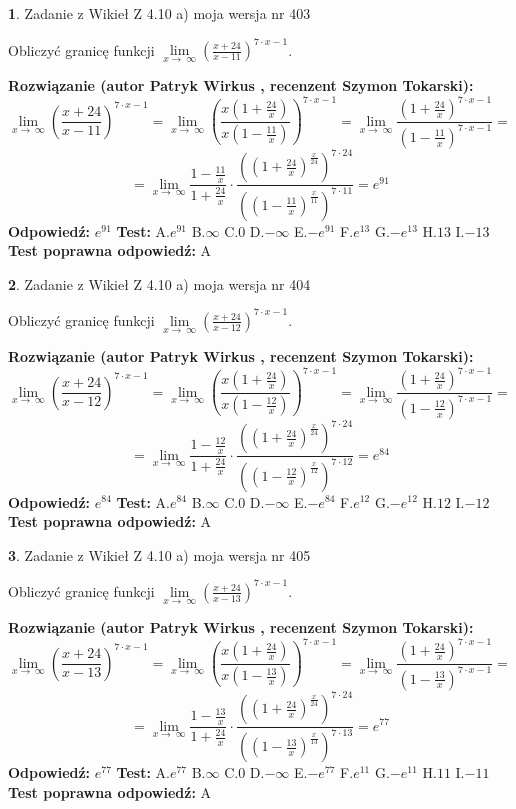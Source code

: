 \documentclass[12pt, a4paper]{article}
\theoremstyle{definition} %
\newtheorem{zad}{}
\newcommand{\zadStart}[1]{\begin{zad}#1\newline}
\newcommand{\zadStop}{\end{zad}}
\newcommand{\rozwStart}[2]{\noindent \textbf{Rozwiązanie (autor #1 , recenzent #2): }\newline}
\newcommand{\rozwStop}{\newline}
\newcommand{\odpStart}{\noindent \textbf{Odpowiedź:}\newline}
\newcommand{\odpStop}{\newline}
\newcommand{\testStart}{\noindent \textbf{Test:}\newline}
\newcommand{\testStop}{\newline}
\newcommand{\kluczStart}{\noindent \textbf{Test poprawna odpowiedź:}\newline}
\newcommand{\kluczStop}{\newline}
\begin{document}
\zadStart{Zadanie z Wikieł Z 4.10 a) moja wersja nr 403}

Obliczyć granicę funkcji  $\lim\limits_{x\to\ \infty}(\frac{x+24}{x-11})^{7\cdot x-1}$.
\zadStop
\rozwStart{Patryk Wirkus}{Szymon Tokarski}
$$\lim\limits_{x\to\ \infty}(\frac{x+24}{x-11})^{7\cdot x-1} = \lim\limits_{x\to\ \infty}(\frac{x(1+\frac{24}{x})}{x(1-\frac{11}{x})})^{7\cdot x-1}=\lim\limits_{x\to\ \infty}\frac{(1+\frac{24}{x})^{7\cdot x-1}}{(1-\frac{11}{x})^{7\cdot x-1}}=$$
$$=\lim\limits_{x\to\ \infty}\frac{1-\frac{11}{x}}{1+\frac{24}{x}}\cdot\frac{((1+\frac{24}{x})^{\frac{x}{24}})^{7\cdot24}}{((1-\frac{11}{x})^{\frac{x}{11}})^{7\cdot11}}=e^{91}$$
\rozwStop
\odpStart
$e^{91}$
\odpStop
\testStart
A.$e^{91}$ B.$\infty$ C.$0$ D.$-\infty$ E.$-e^{91}$
F.$e^{13}$ G.$-e^{13}$
H.$13$
I.$-13$
\testStop
\kluczStart
A
\kluczStop



\zadStart{Zadanie z Wikieł Z 4.10 a) moja wersja nr 404}

Obliczyć granicę funkcji  $\lim\limits_{x\to\ \infty}(\frac{x+24}{x-12})^{7\cdot x-1}$.
\zadStop
\rozwStart{Patryk Wirkus}{Szymon Tokarski}
$$\lim\limits_{x\to\ \infty}(\frac{x+24}{x-12})^{7\cdot x-1} = \lim\limits_{x\to\ \infty}(\frac{x(1+\frac{24}{x})}{x(1-\frac{12}{x})})^{7\cdot x-1}=\lim\limits_{x\to\ \infty}\frac{(1+\frac{24}{x})^{7\cdot x-1}}{(1-\frac{12}{x})^{7\cdot x-1}}=$$
$$=\lim\limits_{x\to\ \infty}\frac{1-\frac{12}{x}}{1+\frac{24}{x}}\cdot\frac{((1+\frac{24}{x})^{\frac{x}{24}})^{7\cdot24}}{((1-\frac{12}{x})^{\frac{x}{12}})^{7\cdot12}}=e^{84}$$
\rozwStop
\odpStart
$e^{84}$
\odpStop
\testStart
A.$e^{84}$ B.$\infty$ C.$0$ D.$-\infty$ E.$-e^{84}$
F.$e^{12}$ G.$-e^{12}$
H.$12$
I.$-12$
\testStop
\kluczStart
A
\kluczStop



\zadStart{Zadanie z Wikieł Z 4.10 a) moja wersja nr 405}

Obliczyć granicę funkcji  $\lim\limits_{x\to\ \infty}(\frac{x+24}{x-13})^{7\cdot x-1}$.
\zadStop
\rozwStart{Patryk Wirkus}{Szymon Tokarski}
$$\lim\limits_{x\to\ \infty}(\frac{x+24}{x-13})^{7\cdot x-1} = \lim\limits_{x\to\ \infty}(\frac{x(1+\frac{24}{x})}{x(1-\frac{13}{x})})^{7\cdot x-1}=\lim\limits_{x\to\ \infty}\frac{(1+\frac{24}{x})^{7\cdot x-1}}{(1-\frac{13}{x})^{7\cdot x-1}}=$$
$$=\lim\limits_{x\to\ \infty}\frac{1-\frac{13}{x}}{1+\frac{24}{x}}\cdot\frac{((1+\frac{24}{x})^{\frac{x}{24}})^{7\cdot24}}{((1-\frac{13}{x})^{\frac{x}{13}})^{7\cdot13}}=e^{77}$$
\rozwStop
\odpStart
$e^{77}$
\odpStop
\testStart
A.$e^{77}$ B.$\infty$ C.$0$ D.$-\infty$ E.$-e^{77}$
F.$e^{11}$ G.$-e^{11}$
H.$11$
I.$-11$
\testStop
\kluczStart
A
\kluczStop
\end{document}
